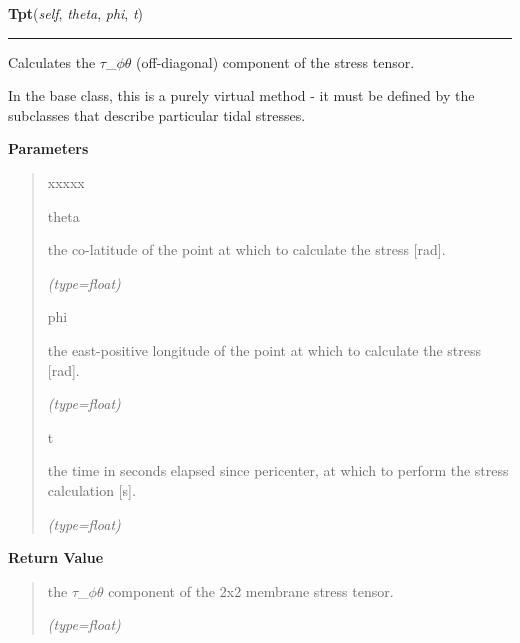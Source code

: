     \label{satstress:SatStress:StressDef:Tpt}

    \vspace{0.5ex}

\hspace{.8\funcindent}\begin{boxedminipage}{\funcwidth}

    \raggedright \textbf{Tpt}(\textit{self}, \textit{theta}, \textit{phi}, \textit{t})

    \vspace{-1.5ex}

    \rule{\textwidth}{0.5\fboxrule}
\setlength{\parskip}{2ex}
    Calculates the \(\tau\)\_\(\phi\)\(\theta\) (off-diagonal) component of
    the stress tensor.

    In the base class, this is a purely virtual method - it must be defined
    by the subclasses that describe particular tidal stresses.

\setlength{\parskip}{1ex}
      \textbf{Parameters}
      \vspace{-1ex}

      \begin{quote}
        \begin{Ventry}{xxxxx}

          \item[theta]

          the co-latitude of the point at which to calculate the stress 
          [rad].

            {\it (type=float)}

          \item[phi]

          the east-positive longitude of the point at which to calculate 
          the stress [rad].

            {\it (type=float)}

          \item[t]

          the time in seconds elapsed since pericenter, at which to perform
          the stress calculation [s].

            {\it (type=float)}

        \end{Ventry}

      \end{quote}

      \textbf{Return Value}
    \vspace{-1ex}

      \begin{quote}
      the \(\tau\)\_\(\phi\)\(\theta\) component of the 2x2 membrane stress
      tensor.

      {\it (type=float)}

      \end{quote}

    \end{boxedminipage}


